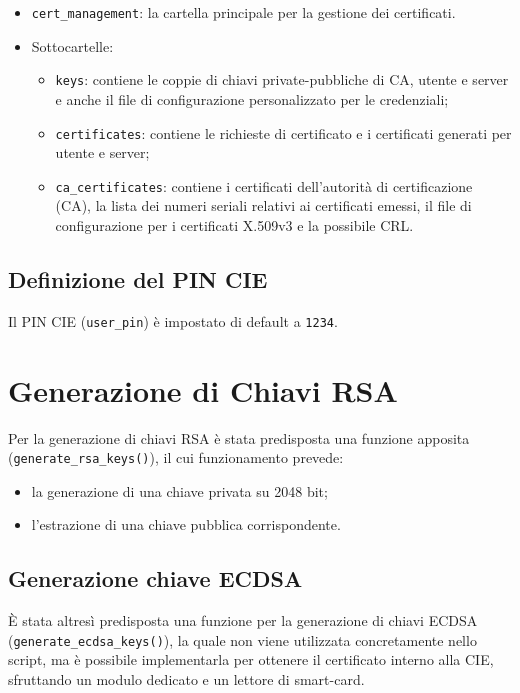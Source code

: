             \begin{itemize}
                \item \texttt{cert\_management}: la cartella principale per la gestione dei certificati.
                
                \item Sottocartelle:
                    \begin{itemize}
                        \item \texttt{keys}: contiene le coppie di chiavi private-pubbliche di CA, utente e server e anche il file di configurazione personalizzato per le credenziali;
                        
                        \item \texttt{certificates}: contiene le richieste di certificato e i certificati generati per utente e server;
                        
                        \item \texttt{ca\_certificates}: contiene i certificati dell'autorità di certificazione (CA), la lista dei numeri seriali relativi ai certificati emessi, il file di configurazione per i certificati X.509v3 e la possibile CRL.
                    \end{itemize}
            \end{itemize}

        \subsection{Definizione del PIN CIE}
            Il PIN CIE (\texttt{user\_pin}) è impostato di default a \texttt{1234}.

    \section{Generazione di Chiavi RSA}
            Per la generazione di chiavi RSA è stata predisposta una funzione apposita (\texttt{generate\_rsa\_keys()}), il cui funzionamento prevede:

            \begin{itemize}
                \item la generazione di una chiave privata su 2048 bit;
                \item l'estrazione di una chiave pubblica corrispondente.
            \end{itemize}

        \subsection{Generazione chiave ECDSA}
            È stata altresì predisposta una funzione per la generazione di chiavi ECDSA (\texttt{generate\_ecdsa\_keys()}), la quale non viene utilizzata concretamente nello script, ma è possibile implementarla per ottenere il certificato interno alla CIE, sfruttando un modulo dedicato e un lettore di smart-card. \\

